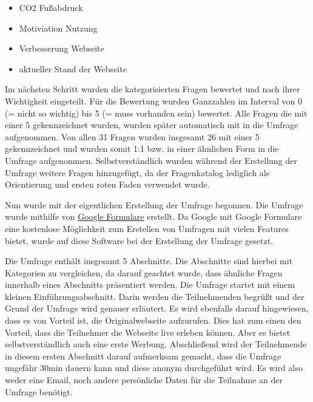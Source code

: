 \begin{itemize}
    \item CO2 Fußabdruck
    \item Motiviation Nutzung
    \item Verbesserung Webseite
    \item aktueller Stand der Webseite
\end{itemize}

Im nächsten Schritt wurden die kategorisierten Fragen bewertet und nach ihrer Wichtigkeit eingeteilt.
Für die Bewertung wurden Ganzzahlen im Interval von 0 (= nicht so wichtig) bis 5 (= muss vorhanden sein) bewertet.
Alle Fragen die mit einer 5 gekennzeichnet wurden, wurden später automatisch mit in die Umfrage aufgenommen.
Von allen 31 Fragen wurden insgesamt 26 mit einer 5 gekennzeichnet und wurden somit 1:1 bzw. in einer ähnlichen Form in die Umfrage aufgenommen.
Selbstverständlich wurden während der Erstellung der Umfrage weitere Fragen hinzugefügt, da der Fragenkatalog lediglich als Orientierung und ersten roten Faden verwendet wurde.\

Nun wurde mit der eigentlichen Erstellung der Umfrage begonnen.
Die Umfrage wurde mithilfe von \href{https://docs.google.com/forms/u/0/}{Google Formulare} erstellt.
Da Google mit Google Formulare eine kostenlose Möglichkeit zum Erstellen von Umfragen mit vielen Features bietet, wurde auf diese Software bei der Erstellung der Umfrage gesetzt.\

Die Umfrage enthält insgesamt 5 Abschnitte.
Die Abschnitte sind hierbei mit Kategorien zu vergleichen, da darauf geachtet wurde, dass ähnliche Fragen innerhalb eines Abschnitts präsentiert werden.
Die Umfrage startet mit einem kleinen Einführungsabschnitt.
Darin werden die Teilnehmenden begrüßt und der Grund der Umfrage wird genauer erläutert.
Es wird ebenfalls darauf hingewiesen, dass es von Vorteil ist, die Originalwebseite aufzurufen.
Dies hat zum einen den Vorteil, dass die Teilnehmer die Webseite live erleben können.
Aber es bietet selbstverständlich auch eine erste Werbung.
Abschließend wird der Teilnehmende in diesem ersten Abschnitt darauf aufmerksam gemacht, dass die Umfrage ungefähr 30min dauern kann und diese anonym durchgeführt wird.
Es wird also weder eine Email, noch andere persönliche Daten für die Teilnahme an der Umfrage benötigt.

